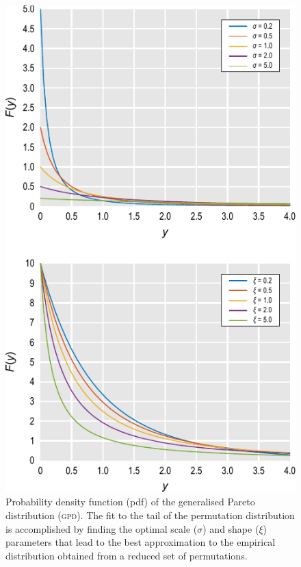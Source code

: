 \begin{figure}[!p]
\begin{center}
\includegraphics{figures/pareto.pdf}
\end{center}
\caption[Density of the generalised Pareto distribution.]{Probability density function (pdf) of the generalised Pareto distribution (\textsc{gpd}). The fit to the tail of the permutation distribution is accomplished by finding the optimal scale ($\sigma$) and shape ($\xi$) parameters that lead to the best approximation to the empirical distribution obtained from a reduced set of permutations.}
\label{fig:pareto}
\end{figure}

